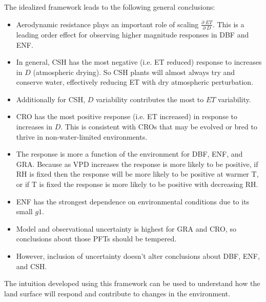 \documentclass[draft,linenumbers]{agujournal}
\begin{document}
The idealized framework leads to the following general conclusions:
\begin{itemize}
  \item Aerodynamic resistance plays an important role of scaling $\frac{\partial \; ET}{\partial \; D}$. This is a leading order effect for observing higher magnitude responses in DBF and ENF.
  \item In general, CSH has the most negative (i.e. ET reduced) response to increases in $D$ (atmospheric drying). So CSH plants will almost always try and conserve water, effectively reducing ET with dry atmospheric perturbation.
    \item Additionally for CSH, $D$ variability contributes the most to $ET$ variability.
\item CRO has the most positive response (i.e. ET increased) in response to increases in $D$. This is consistent with CROs that may be evolved or bred to thrive in non-water-limited environments.
\item The response is more a function of the environment for DBF, ENF, and GRA. Because as VPD increases the response is more likely to be positive, if RH is fixed then the response will be more likely to be positive at warmer T, or if T is fixed the response is more likely to be positive with decreasing RH.
\item ENF has the strongest dependence on environmental conditions due to its small $g1$.
\item Model and observational uncertainty is highest for GRA and CRO, so conclusions about those PFTs should be tempered.
\item However, inclusion of uncertainty doesn't alter conclusions about DBF, ENF, and CSH.
\end{itemize}

The intuition developed using this framework can be used to understand how the land surface will respond and contribute to changes in the environment. 

  
\end{document}
